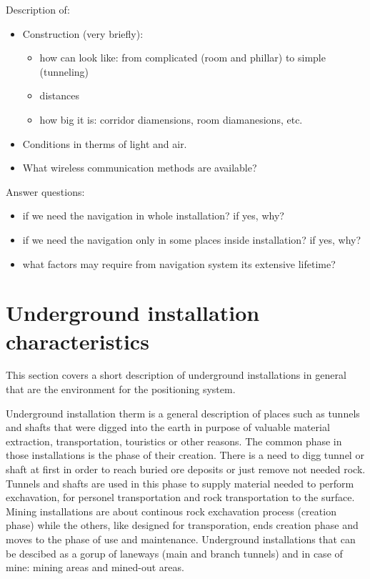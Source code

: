 \documentclass[../main.tex]{subfiles}
\begin{document}
Description of:
\begin{itemize}
	\item Construction (very briefly):
	\begin{itemize}
		\item how can look like: from complicated (room and phillar) to simple (tunneling)
		\item distances
		\item how big it is: corridor diamensions, room diamanesions, etc.
	\end{itemize}
	\item Conditions in therms of light and air.
	\item What wireless communication methods are available?
\end{itemize}

Answer questions:
\begin{itemize}
	\item if we need the navigation in whole installation? if yes, why?
	\item if we need the navigation only in some places inside installation? if yes, why?
	\item what factors may require from navigation system its extensive lifetime?
\end{itemize}

\section{Underground installation characteristics}

This section covers a short description of underground installations in general that are the environment for the positioning system.

Underground installation therm is a general description of places such as tunnels and shafts that were digged into the earth in purpose of valuable material extraction, transportation, touristics or other reasons. The common phase in those installations is the phase of their creation. There is a need to digg tunnel or shaft at first in order to reach buried ore deposits or just remove not needed rock. Tunnels and shafts are used in this phase to supply material needed to perform exchavation, for personel transportation and rock transportation to the surface. Mining installations are about continous rock exchavation process (creation phase) while the others, like designed for transporation, ends creation phase and moves to the phase of use and maintenance. Underground installations that can be descibed as a gorup of laneways (main and branch tunnels) and in case of mine: mining areas and mined-out areas.
\end{document}
